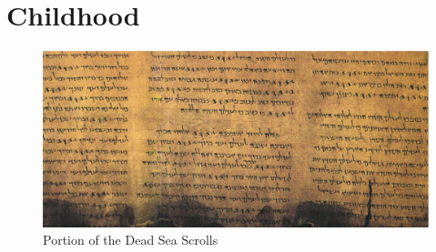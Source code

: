 \documentclass[11pt,a4paper]{scrartcl} %
\begin{document}
\section{Childhood}
\begin{figure}
\centering
\caption{Portion of the Dead Sea Scrolls}
\includegraphics[scale=.50]{deadsea}
\end{figure}
\end{document}
